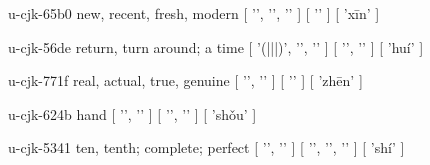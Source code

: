 \begin{multicols}{2}
\cjkgGlue{} u-cjk-65b0  new, recent, fresh, modern  [ '\cjkgGlue{}', '\cjkgGlue{}', '\cjkgGlue{}' ]  [ '\cjkgGlue{}' ]  [ 'x{\mktsRsgFb{}ī}n' ] 

\cjkgGlue{} u-cjk-56de  return, turn around; a time  [ '\cjkgGlue{}(\cjkgGlue{}|\cjkgGlue{}|\cjkgGlue{}|\cjkgGlue{})', '\cjkgGlue{}', '\cjkgGlue{}' ]  [ '\cjkgGlue{}', '\cjkgGlue{}' ]  [ 'huí' ] 

\cjkgGlue{} u-cjk-771f  real, actual, true, genuine  [ '\cjkgGlue{}', '\cjkgGlue{}' ]  [ '\cjkgGlue{}' ]  [ 'zh{\mktsRsgFb{}ē}n' ] 

\cjkgGlue{} u-cjk-624b  hand  [ '\cjkgGlue{}', '\cjkgGlue{}' ]  [ '\cjkgGlue{}', '\cjkgGlue{}' ]  [ 'sh{\mktsRsgFb{}ǒ}u' ] 

\cjkgGlue{} u-cjk-5341  ten, tenth; complete; perfect  [ '\cjkgGlue{}', '\cjkgGlue{}' ]  [ '\cjkgGlue{}', '\cjkgGlue{}', '\cjkgGlue{}' ]  [ 'shí' ] 


\end{multicols}
